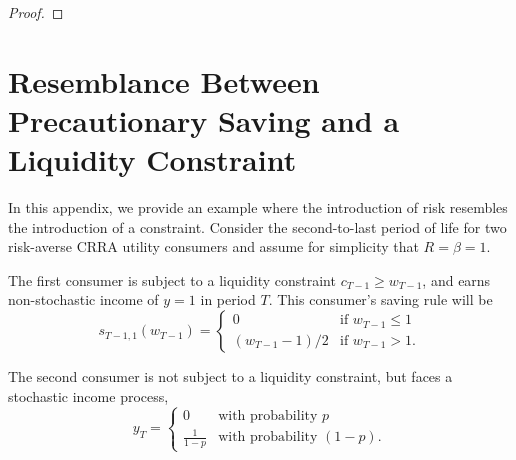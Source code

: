 \begin{proof}
%	
\end{proof}

\section{Resemblance Between Precautionary Saving and a Liquidity Constraint} \label{app:similar}
In this appendix, we provide an example where the introduction of risk resembles the introduction of a constraint. Consider the second-to-last period of life for two risk-averse CRRA utility consumers and assume for simplicity that $R=\beta=1$.

The first consumer is subject to a liquidity constraint $c_{T-1} \geq w_{T-1}$, and earns non-stochastic income of ${y}=1$ in period $T$. This consumer's saving rule will be
\begin{equation*}
s_{T-1,1}(w_{T-1}) =
\begin{cases}
0   & \mbox{if $w_{T-1} \leq 1$}
\\    (w_{T-1}-1)/2 & \mbox{if $w_{T-1} > 1$}.
\end{cases}
\end{equation*}

The second consumer is not subject to a liquidity constraint, but
faces a stochastic income process,
\begin{equation*}
y_{T} =
\begin{cases}
0 & \mbox{with probability $p$}
\\ \frac{1}{1-p} & \mbox{with probability $(1-p)$}.
\end{cases}
\end{equation*}


